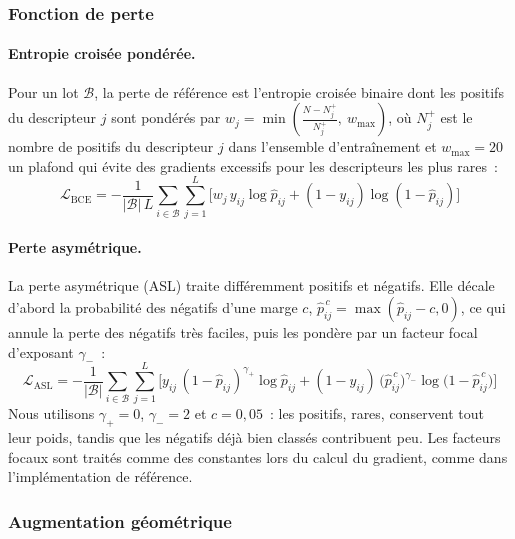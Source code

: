 \subsubsection{Fonction de perte}

\paragraph{Entropie croisée pondérée.}
Pour un lot $\mathcal{B}$, la perte de référence est l'entropie croisée binaire dont les positifs du descripteur $j$ sont pondérés par $w_j = \min\left(\frac{N - N_j^{+}}{N_j^{+}},\ w_{\max}\right)$, où $N_j^{+}$ est le nombre de positifs du descripteur $j$ dans l'ensemble d'entraînement et $w_{\max} = 20$ un plafond qui évite des gradients excessifs pour les descripteurs les plus rares~:
\begin{equation}
   \label{eq:BCE}
   \mathcal{L}_{\mathrm{BCE}} = -\frac{1}{|\mathcal{B}|\,L} \sum_{i \in \mathcal{B}} \sum_{j=1}^{L} \Big[ w_j \, y_{ij} \log \hat{p}_{ij} + (1 - y_{ij}) \log (1 - \hat{p}_{ij}) \Big]
\end{equation}

\paragraph{Perte asymétrique.}
La perte asymétrique (ASL) \cite{Ridnik-2021} traite différemment positifs et négatifs.
Elle décale d'abord la probabilité des négatifs d'une marge $c$, $\hat{p}^{\,c}_{ij} = \max(\hat{p}_{ij} - c, 0)$, ce qui annule la perte des négatifs très faciles, puis les pondère par un facteur focal d'exposant $\gamma_-$~:
\begin{equation}
   \label{eq:ASL}
   \mathcal{L}_{\mathrm{ASL}} = -\frac{1}{|\mathcal{B}|} \sum_{i \in \mathcal{B}} \sum_{j=1}^{L} \Big[ y_{ij} \, (1 - \hat{p}_{ij})^{\gamma_+} \log \hat{p}_{ij} + (1 - y_{ij}) \, \big(\hat{p}^{\,c}_{ij}\big)^{\gamma_-} \log \big(1 - \hat{p}^{\,c}_{ij}\big) \Big]
\end{equation}
Nous utilisons $\gamma_+ = 0$, $\gamma_- = 2$ et $c = 0{,}05$~: les positifs, rares, conservent tout leur poids, tandis que les négatifs déjà bien classés contribuent peu.
Les facteurs focaux sont traités comme des constantes lors du calcul du gradient, comme dans l'implémentation de référence.

\subsubsection{Augmentation géométrique}

